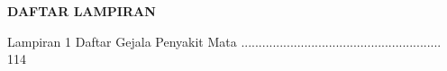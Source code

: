 \newpage %
\begin{center}
\begin{large}\textbf{DAFTAR LAMPIRAN}\\\end{large}
\end{center}
\vspace{5mm} Lampiran 1 Daftar Gejala Penyakit Mata
.........................................................
114

